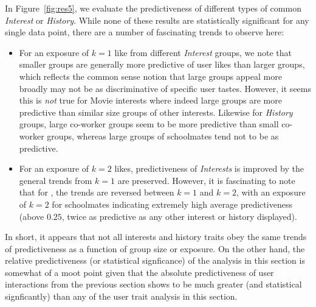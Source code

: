 In Figure~\ref{fig:res5}, we evaluate the predictiveness of different
types of common \textit{Interest} or \textit{History}.  While none of
these results are statistically significant for any single data point,
there are a number of fascinating trends to observe here:
\begin{itemize}
\item For an exposure of $k=1$ like from different \textit{Interest}
groups, we note that smaller groups are generally more predictive of
user likes than larger groups, which reflects the common sense notion
that large groups appeal more broadly may not be as discriminative of
specific user tastes.  However, it seems this is \emph{not} true for
Movie interests where indeed large groups are more predictive than
similar size groups of other interests. Likewise for \textit{History}
groups, large co-worker groups seem to be more predictive than small
co-worker groups, whereas large groups of schoolmates tend not to be
as predictive.  
\item For an exposure of $k=2$ likes, predictiveness of
\textit{Interests} is improved by the general trends from $k=1$
are preserved.  However, it is fascinating to note that 
for , the trends are reversed between $k=1$
and $k=2$, with an exposure of $k=2$ for schoolmates indicating
extremely high average predictiveness (above $0.25$, twice
as predictive as any other interest or history displayed).
\end{itemize}
In short, it appears that not all interests and history traits obey
the same trends of predictiveness as a function of group size or
exposure.  On the other hand, the relative predictiveness (or
statistical signficance) of the analysis in this section is somewhat
of a moot point given that the absolute predictiveness of user
interactions from the previous section shows to be much greater (and
statistical signficantly) than any of the user trait analysis in this
section.




